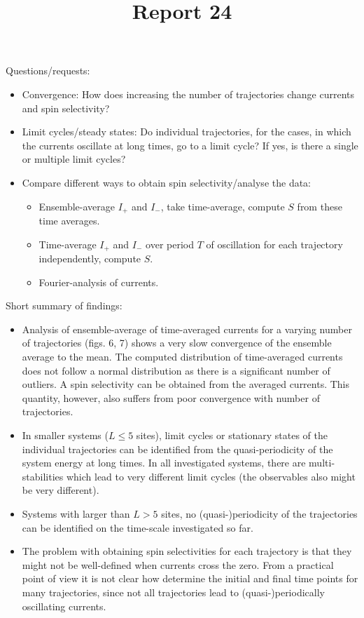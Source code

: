 \documentclass{article}
\begin{document}
\title{Report 24}
\maketitle

Questions/requests:
\begin{itemize}
	\item Convergence: How does increasing the number of trajectories change currents and spin selectivity? 
	\item Limit cycles/steady states: Do individual trajectories, for the cases, in which the currents oscillate at long times, go to a limit cycle? If yes, is there a single or multiple limit cycles? 
	\item Compare different ways to obtain spin selectivity/analyse the data: 
	\begin{itemize}
		\item Ensemble-average $I_+$ and $I_-$, take time-average, compute $S$ from these time averages.
		\item Time-average $I_+$ and $I_-$ over period $T$ of oscillation for each trajectory independently, compute $S$.
		\item Fourier-analysis of currents. 
	\end{itemize}
\end{itemize}

Short summary of findings:
\begin{itemize}
	\item Analysis of ensemble-average of time-averaged currents for a varying number of trajectories (figs. 6, 7) shows a very slow convergence of the ensemble average to the mean. The computed distribution of time-averaged currents does not follow a normal distribution as there is a significant number of outliers. 
	A spin selectivity can be obtained from the averaged currents. This quantity, however, also suffers from poor convergence with number of trajectories. 
	\item In smaller systems ($L\leq 5$ sites), limit cycles or stationary states of the individual trajectories can be identified from the quasi-periodicity of the system energy at long times. In all investigated systems, there are multi-stabilities which lead to very different limit cycles (the observables also might be very different).  
	\item Systems with larger than $L>5$ sites, no (quasi-)periodicity of the trajectories can be identified on the time-scale investigated so far. 
	\item The problem with obtaining spin selectivities for each trajectory is that they might not be well-defined when currents cross the zero. From a practical point of view it is not clear how determine the initial and final time points for many trajectories, since not all trajectories lead to (quasi-)periodically oscillating currents.    
\end{itemize}
\clearpage
\end{document}
